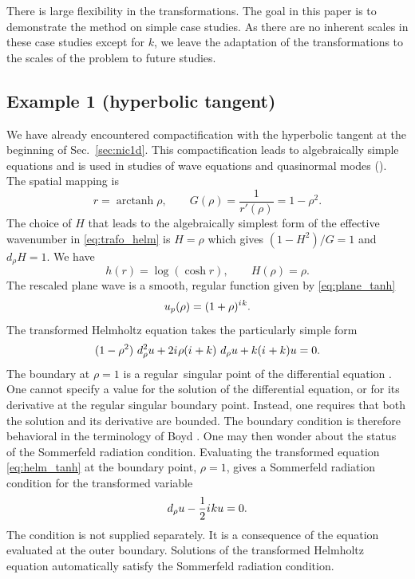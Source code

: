\documentclass[draft,onefignum,onetabnum]{siamart190516}
\newcommand{\be}{\begin{equation}}
\newcommand{\ee}{\end{equation}}
\newcommand{\iu}{{i\mkern1mu}}
\DeclareMathOperator\arctanh{arctanh}
\begin{document}
There is large flexibility in the transformations. The goal in this paper is to demonstrate the method on simple case studies. As there are no inherent scales in these case studies except for $k$, we leave the adaptation of the transformations to the scales of the problem to future studies.

\subsection{Example 1 (hyperbolic tangent)}
We have already encountered compactification with the hyperbolic tangent at the beginning of Sec.~\ref{sec:nic1d}. This compactification leads to algebraically simple equations and is used in studies of wave equations and quasinormal modes (\cite{bizon2017global, bizon2020toy, donninger2020strichartz}). The spatial mapping is
\be\label{eq:ex1_mapping} r = \arctanh \rho, \qquad G(\rho) = \frac{1}{r'(\rho)} = 1-\rho^2. \ee
The choice of $H$ that leads to the algebraically simplest form of the effective wavenumber in \eqref{eq:trafo_helm} is $H=\rho$ which gives $(1-H^2)/G=1$ and $d_\rho H=1$. We have
\[ h(r) = \log(\cosh r), \qquad H(\rho) = \rho. \]
The rescaled plane wave is a smooth, regular function given by \eqref{eq:plane_tanh}
\[ u_p(\rho) = (1+\rho)^{\iu k}.\]
The transformed Helmholtz equation takes the particularly simple form
\be\label{eq:helm_tanh} (1-\rho^2) \ d_\rho^2 u  + 2\iu \rho (\iu + k) \ d_\rho u + k (\iu+k) u = 0. \ee
The boundary at $\rho=1$ is a regular singular point of the differential equation \cite{powers2009boundary}. One cannot specify a value for the solution of the differential equation, or for its derivative at the regular singular boundary point. Instead, one requires that both the solution and its derivative are bounded. The boundary condition is therefore behavioral in the terminology of Boyd \cite{boyd2001chebyshev}. One may then wonder about the status of the Sommerfeld radiation condition. Evaluating the transformed equation \eqref{eq:helm_tanh} at the boundary point, $\rho=1$, gives a Sommerfeld radiation condition for the transformed variable
\be\label{eq:simple_sommerfeld} d_\rho u - \frac{1}{2} \iu k u = 0. \ee
The condition is not supplied separately. It is a consequence of the equation evaluated at the outer boundary. Solutions of the transformed Helmholtz equation automatically satisfy the Sommerfeld radiation condition.

\end{document}
